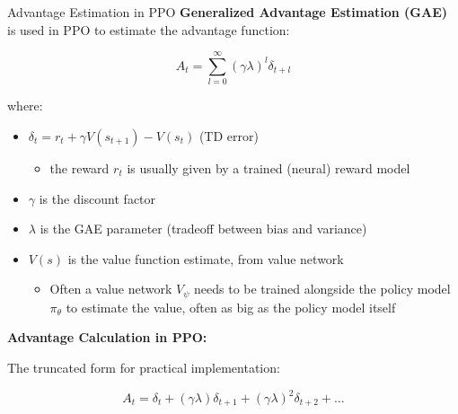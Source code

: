 \documentclass[8pt]{beamer}
\begin{document}
\begin{frame}{Advantage Estimation in PPO}
    \textbf{Generalized Advantage Estimation (GAE)} is used in PPO to estimate the advantage function:
    
    \begin{equation}
    A_t = \sum_{l=0}^{\infty} (\gamma \lambda)^l \delta_{t+l}
    \end{equation}

    where:
    \begin{itemize}\setlength{\itemsep}{5pt}
        \item $\delta_t = r_t + \gamma V(s_{t+1}) - V(s_t)$ (TD error)
        \begin{itemize}
            \item the reward $r_t$ is usually given by a trained (neural) reward model
        \end{itemize}
        \item $\gamma$ is the discount factor
        \item $\lambda$ is the GAE parameter (tradeoff between bias and variance)
        \item $V(s)$ is the value function estimate, from value network
        \begin{itemize}
            \item Often a value network $V_\psi$ needs to
be trained alongside the policy model $\pi_\theta$ to estimate the value, often as big as the policy model itself
        \end{itemize}
    \end{itemize}

    \vspace{1em}

    \textbf{Advantage Calculation in PPO:}
    
    The truncated form for practical implementation:
    
    \begin{equation}
    A_t = \delta_t + (\gamma \lambda) \delta_{t+1} + (\gamma \lambda)^2 \delta_{t+2} + \dots
    \end{equation}
    
\end{frame}
\end{document}
